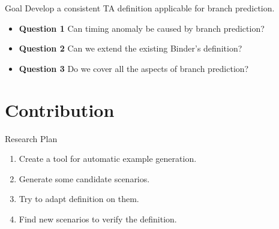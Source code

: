 \documentclass{beamer}
\begin{document}
\begin{frame}
    \begin{block}{Goal}
        Develop a consistent TA definition applicable for branch prediction.
    \end{block}

    \begin{itemize}
        \item \textbf{Question 1} Can timing anomaly be caused by branch prediction?
        \item \textbf{Question 2} Can we extend the existing Binder's definition?
        \item \textbf{Question 3} Do we cover all the aspects of branch prediction?
    \end{itemize}

\end{frame}

\section{Contribution}

\begin{frame}{Research Plan}
    \begin{enumerate}
        \item Create a tool for automatic example generation.
        \item Generate some candidate scenarios.
        \item Try to adapt definition on them.
        \item Find new scenarios to verify the definition.
    \end{enumerate}
\end{frame}
\end{document}
